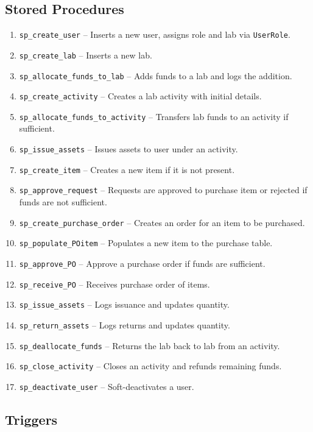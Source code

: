 \documentclass[11pt]{article}
\begin{document}
\subsection*{Stored Procedures}
\begin{enumerate}
  \item \texttt{sp\_create\_user} – Inserts a new user, assigns role and lab via \texttt{UserRole}.
  \item \texttt{sp\_create\_lab} – Inserts a new lab.
  \item \texttt{sp\_allocate\_funds\_to\_lab} – Adds funds to a lab and logs the addition.
  \item \texttt{sp\_create\_activity} – Creates a lab activity with initial details.
  \item \texttt{sp\_allocate\_funds\_to\_activity} – Transfers lab funds to an activity if sufficient.
  \item \texttt{sp\_issue\_assets} – Issues assets to user under an activity.
  \item \texttt{sp\_create\_item} – Creates a new item if it is not present.
  \item \texttt{sp\_approve\_request} – Requests are approved to purchase item or rejected if funds are not sufficient.
  \item \texttt{sp\_create\_purchase\_order} – Creates an order for an item to be purchased.
  \item \texttt{sp\_populate\_POitem} – Populates a new item to the purchase table.
  \item \texttt{sp\_approve\_PO} – Approve a purchase order if funds are sufficient.
  \item \texttt{sp\_receive\_PO} – Receives purchase order of items.
  \item \texttt{sp\_issue\_assets} – Logs issuance and updates quantity.
  \item \texttt{sp\_return\_assets} – Logs returns and updates quantity.
  \item \texttt{sp\_deallocate\_funds} – Returns the lab back to lab from an activity.
  \item \texttt{sp\_close\_activity} – Closes an activity and refunds remaining funds.
  \item \texttt{sp\_deactivate\_user} – Soft-deactivates a user.
\end{enumerate}

\subsection*{Triggers}
\end{document}
